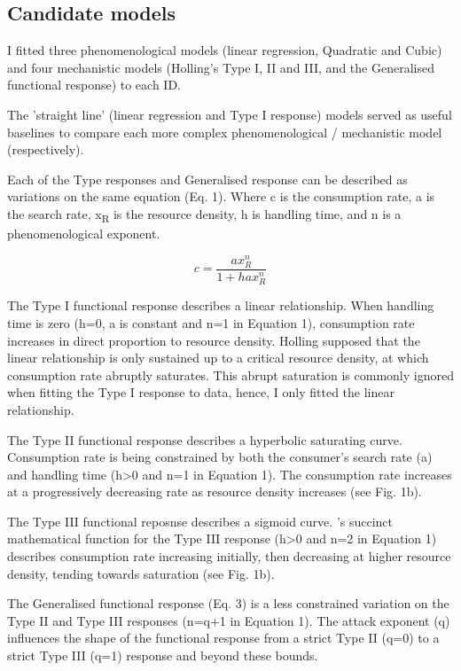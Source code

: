 \documentclass[11pt]{article}
\begin{document}
        \subsection{Candidate models}
            I fitted three phenomenological models (linear regression, Quadratic and Cubic) and four mechanistic models (Holling's Type I, II and III, and the Generalised functional response) to each ID.

            The 'straight line' (linear regression and Type I response) models served as useful baselines to compare each more complex phenomenological / mechanistic model (respectively).

            Each of the Type responses and Generalised response can be described as variations on the same equation (Eq. 1). Where c is the consumption rate, a is the search rate, x\textsubscript{R} is the resource density, h is handling time, and n is a phenomenological exponent.

            \begin{equation}
                c = \frac{ax_{R}^n}{1 + hax_{R}^n}
            \end{equation}

            The Type I functional response describes a linear relationship. When handling time is zero (h=0, a is constant and n=1 in Equation 1), consumption rate increases in direct proportion to resource density. Holling \citep{holling1959some} supposed that the linear relationship is only sustained up to a critical resource density, at which consumption rate abruptly saturates. This abrupt saturation is commonly ignored when fitting the Type I response to data, hence, I only fitted the linear relationship.
            
            The Type II functional response \citep{holling1959some} describes a hyperbolic saturating curve. Consumption rate is being constrained by both the consumer's search rate (a) and handling time (h\textgreater0 and n=1 in Equation 1). The consumption rate increases at a progressively decreasing rate as resource density increases (see Fig. 1b).

            The Type III functional reposnse \citep{holling1966functional} describes a sigmoid curve. \citet{real1977kinetics}'s succinct mathematical function for the Type III response (h\textgreater0 and n=2 in Equation 1) describes consumption rate increasing initially, then decreasing at higher resource density, tending towards saturation (see Fig. 1b).

            The Generalised functional response (Eq. 3) is a less constrained variation on the Type II and Type III responses (n=q+1 in Equation 1). The attack exponent (q) influences the shape of the functional response from a strict Type II (q=0) to a strict Type III (q=1) response and beyond these bounds.
\end{document}
